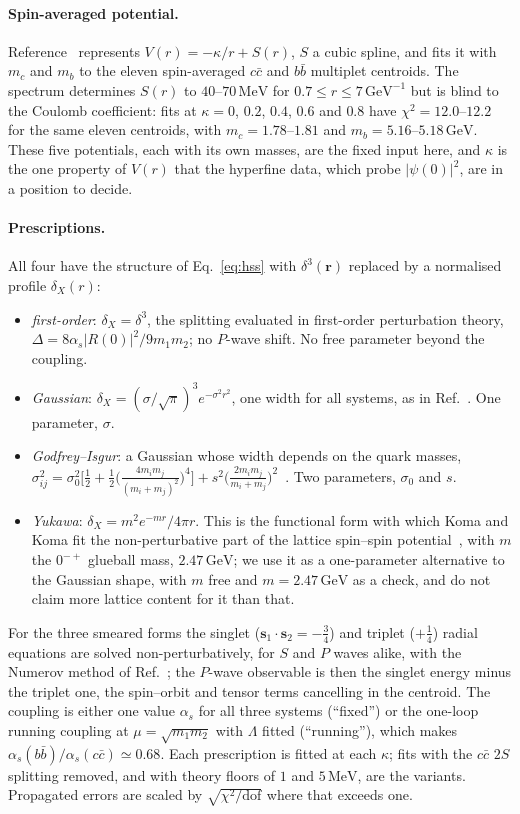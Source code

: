 \documentclass[10pt,twocolumn]{article}
\newcommand{\cc}{c\bar c}
\newcommand{\bb}{b\bar b}
\newcommand{\MeV}{\,\mathrm{MeV}}
\newcommand{\GeV}{\,\mathrm{GeV}}
\newcommand{\GeVi}{\,\mathrm{GeV}^{-1}}
\begin{document}
\paragraph{Spin-averaged potential.}
Reference~\cite{Oppong2026b} represents $V(r)=-\kappa/r+S(r)$, $S$ a cubic spline, and fits it with $m_c$ and $m_b$ to the eleven spin-averaged $\cc$ and $\bb$ multiplet centroids.
The spectrum determines $S(r)$ to $40$--$70\MeV$ for $0.7\le r\le7\GeVi$ but is blind to the Coulomb coefficient: fits at $\kappa=0$, $0.2$, $0.4$, $0.6$ and $0.8$ have $\chi^2=12.0$--$12.2$ for the same eleven centroids, with $m_c=1.78$--$1.81$ and $m_b=5.16$--$5.18\GeV$.
These five potentials, each with its own masses, are the fixed input here, and $\kappa$ is the one property of $V(r)$ that the hyperfine data, which probe $|\psi(0)|^2$, are in a position to decide.

\paragraph{Prescriptions.}
All four have the structure of Eq.~\eqref{eq:hss} with $\delta^3(\mathbf r)$ replaced by a normalised profile $\delta_X(r)$:
\begin{itemize}
\item \emph{first-order}: $\delta_X=\delta^3$, the splitting evaluated in first-order perturbation theory, $\Delta=8\alpha_s|R(0)|^2/9m_1m_2$; no $P$-wave shift. No free parameter beyond the coupling.
\item \emph{Gaussian}: $\delta_X=(\sigma/\sqrt\pi)^3e^{-\sigma^2r^2}$, one width for all systems, as in Ref.~\cite{BGS2005}. One parameter, $\sigma$.
\item \emph{Godfrey--Isgur}: a Gaussian whose width depends on the quark masses, $\sigma_{ij}^2=\sigma_0^2\big[\tfrac12+\tfrac12\big(\tfrac{4m_im_j}{(m_i+m_j)^2}\big)^4\big]+s^2\big(\tfrac{2m_im_j}{m_i+m_j}\big)^2$~\cite{Godfrey1985}. Two parameters, $\sigma_0$ and $s$.
\item \emph{Yukawa}: $\delta_X=m^2e^{-mr}/4\pi r$. This is the functional form with which Koma and Koma fit the non-perturbative part of the lattice spin--spin potential~\cite{KomaKoma2007}, with $m$ the $0^{-+}$ glueball mass, $2.47\GeV$; we use it as a one-parameter alternative to the Gaussian shape, with $m$ free and $m=2.47\GeV$ as a check, and do not claim more lattice content for it than that.
\end{itemize}
For the three smeared forms the singlet ($\mathbf s_1\!\cdot\!\mathbf s_2=-\tfrac34$) and triplet ($+\tfrac14$) radial equations are solved non-perturbatively, for $S$ and $P$ waves alike, with the Numerov method of Ref.~\cite{Oppong2026}; the $P$-wave observable is then the singlet energy minus the triplet one, the spin--orbit and tensor terms cancelling in the centroid.
The coupling is either one value $\alpha_s$ for all three systems (``fixed'') or the one-loop running coupling at $\mu=\sqrt{m_1m_2}$ with $\Lambda$ fitted (``running''), which makes $\alpha_s(\bb)/\alpha_s(\cc)\simeq0.68$.
Each prescription is fitted at each $\kappa$; fits with the $\cc$ $2S$ splitting removed, and with theory floors of $1$ and $5\MeV$, are the variants.
Propagated errors are scaled by $\sqrt{\chi^2/\mathrm{dof}}$ where that exceeds one.
\end{document}
